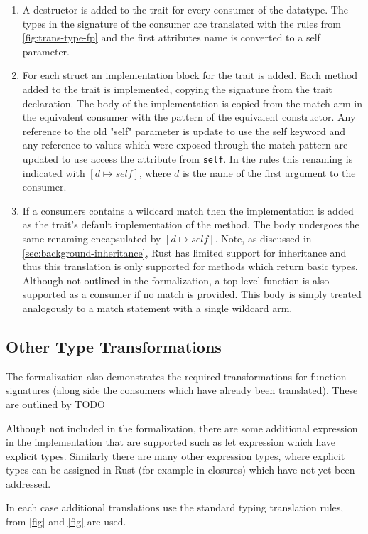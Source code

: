 \documentclass[ oneside,%
                    author={James Elgar},
                    degree={MEng},
                     title={Bidirectional transformer between functional and \\ object-oriented programming in Rust},
                  subtitle={}]{dissertation}
\begin{document}
\begin{enumerate}
    \item A destructor is added to the trait for every consumer of the datatype. The types in the signature of the consumer are translated with the rules from \autoref{fig:trans-type-fp} and the first attributes name is converted to a self parameter.
    \item For each struct an implementation block for the trait is added. Each method added to the trait is implemented, copying the signature from the trait declaration. The body of the implementation is copied from the match arm in the equivalent consumer with the pattern of the equivalent constructor. Any reference to the old "self" parameter is update to use the self keyword and any reference to values which were exposed through the match pattern are updated to use access the attribute from \verb|self|. In the rules this renaming is indicated with $[d \mapsto self]$, where $d$ is the name of the first argument to the consumer.
    \item If a consumers contains a wildcard match then the implementation is added as the trait's default implementation of the method. The body undergoes the same renaming encapsulated by $[d \mapsto self]$. Note, as discussed in \autoref{sec:background-inheritance}, Rust has limited support for inheritance and thus this translation is only supported for methods which return basic types. Although not outlined in the formalization, a top level function is also supported as a consumer if no match is provided. This body is simply treated analogously to a match statement with a single wildcard arm.
\end{enumerate}

\subsection{Other Type Transformations}

The formalization also demonstrates the required transformations for function signatures (along side the consumers which have already been translated). These are outlined by TODO

Although not included in the formalization, there are some additional expression in the implementation that are supported such as let expression which have explicit types. 
Similarly there are many other expression types, where explicit types can be assigned in Rust (for example in closures) which have not yet been addressed.

In each case additional translations use the standard typing translation rules, from \autoref{fig} and \autoref{fig} are used.
\end{document}
